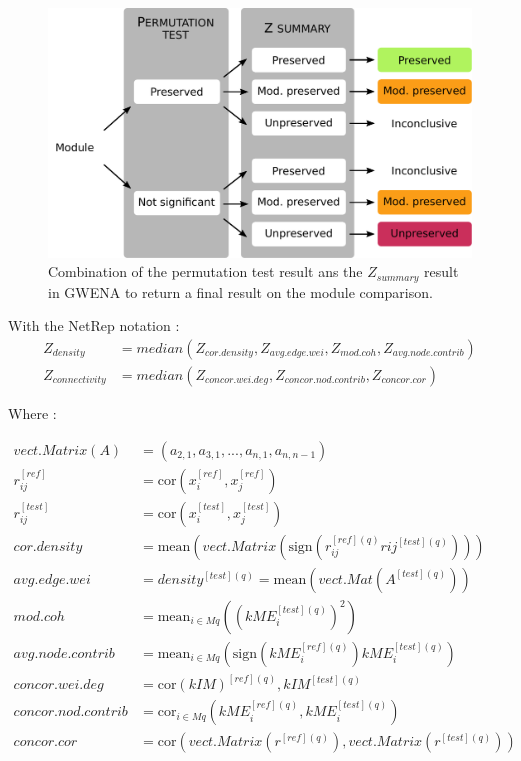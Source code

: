 \begin{figure}[ht]
    \includegraphics[width=\textwidth, center]{img/annexe_add_file_GWENA/additional_file_figure_1.pdf}
    \caption{Combination of the permutation test result ans the $Z_{summary}$ result in GWENA to return a final result on the module comparison.}
    \label{fig:supp_fig_comparison_schema_conclusion}
\end{figure}


With the NetRep notation :
\begin{align*}
    Z_{density} & = median(Z_{cor.density},Z_{avg.edge.wei},Z_{mod.coh},Z_{avg.node.contrib}) \\
    Z_{connectivity} & = median(Z_{concor.wei.deg},Z_{concor.nod.contrib},Z_{concor.cor})
\end{align*} 

Where : 
\begin{small}
    \begin{align*}
        vect.Matrix(A) & = (a_{2,1},a_{3,1},...,a_{n,1},a_{n,n-1}) \\
        r_{ij}^{[ref]} & = \text{cor}(x_i^{[ref]}, x_j^{[ref]}) \\
        r_{ij}^{[test]} & = \text{cor}(x_i^{[test]}, x_j^{[test]}) \\
        cor.density & = \text{mean}(vect.Matrix(\text{sign}(r_{ij}^{[ref](q)}r{ij}^{[test](q)}))) \\
        avg.edge.wei & = density^{[test](q)} = \text{mean}(vect.Mat(A^{[test](q)})) \\
        mod.coh & = \text{mean}_{i\in Mq}((kME_i^{[test](q)})^2) \\
        avg.node.contrib & = \text{mean}_{i\in Mq}(\text{sign}(kME_i^{[ref](q)})kME_i^{[test](q)})  \\
        concor.wei.deg & = \text{cor}(kIM)^{[ref](q)}, kIM^{[test](q)}  \\
        concor.nod.contrib & = \text{cor}_{i\in Mq}(kME_i^{[ref](q)},kME_i^{[test](q)})  \\
        concor.cor & = \text{cor}(vect.Matrix(r^{[ref](q)}), vect.Matrix(r^{[test](q)}))  
    \end{align*}
\end{small}

